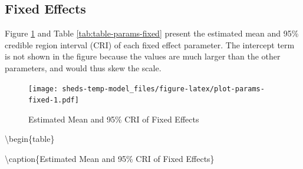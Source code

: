 \documentclass[]{book}
\begin{document}
\hypertarget{fixed-effects-1}{%
\subsection{Fixed Effects}\label{fixed-effects-1}}

Figure \ref{fig:plot-params-fixed} and Table \ref{tab:table-params-fixed} present the estimated mean and 95\% credible region interval (CRI) of each fixed effect parameter. The intercept term is not shown in the figure because the values are much larger than the other parameters, and would thus skew the scale.

\begin{figure}
\centering
\texttt{[image: sheds-temp-model\_files/figure-latex/plot-params-fixed-1.pdf]}
\caption{\label{fig:plot-params-fixed}Estimated Mean and 95\% CRI of Fixed Effects}
\end{figure}

\textbackslash{}begin\{table\}

\textbackslash{}caption\{\label{tab:table-params-fixed}Estimated Mean and 95\% CRI of Fixed Effects\}
\centering
\end{document}

